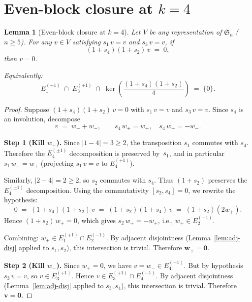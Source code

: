 \documentclass[11pt]{article}
\newtheorem{lemma}[theorem]{Lemma}
\theoremstyle{definition}
\theoremstyle{remark}
\newcommand{\Sym}{\mathfrak{S}}
\begin{document}
\section{Even-block closure at $k = 4$}

\begin{lemma}[Even-block closure at $k = 4$]\label{lem:k4}
Let $V$ be any representation of\/ $\Sym_n$ ($n \ge 5$).  For any
$v \in V$ satisfying $s_1\, v = v$ and $s_3\, v = v$, if
\[
  (1 + s_4)(1 + s_2)\, v \;=\; 0,
\]
then $v = 0$.

\noindent
Equivalently:
\[
  E_1^{(+1)} \;\cap\; E_3^{(+1)} \;\cap\;
  \ker\!\left(\frac{(1 + s_4)(1 + s_2)}{4}\right) \;=\; \{0\}.
\]
\end{lemma}

\begin{proof}
Suppose $(1 + s_4)(1 + s_2)\, v = 0$ with $s_1\, v = v$ and
$s_3\, v = v$.  Since $s_4$ is an involution, decompose
\[
  v \;=\; w_+ + w_-, \qquad s_4\, w_+ = w_+,\quad s_4\, w_- = -w_-.
\]

\medskip
\noindent\textbf{Step 1 (Kill $w_+$).}\;
Since $|1 - 4| = 3 \ge 2$, the transposition $s_1$ commutes with
$s_4$.  Therefore the $E_4^{(\pm 1)}$ decomposition is preserved
by~$s_1$, and in particular $s_1\, w_+ = w_+$ (projecting
$s_1\, v = v$ to $E_4^{(+1)}$).

Similarly, $|2 - 4| = 2 \ge 2$, so $s_2$ commutes with $s_4$.
Thus $(1 + s_2)$ preserves the $E_4^{(\pm 1)}$ decomposition.
Using the commutativity $[s_2, s_4] = 0$, we rewrite the hypothesis:
\[
  0 \;=\; (1 + s_4)(1 + s_2)\, v
    \;=\; (1 + s_2)(1 + s_4)\, v
    \;=\; (1 + s_2)(2 w_+).
\]
Hence $(1 + s_2)\, w_+ = 0$, which gives $s_2\, w_+ = -w_+$,
i.e., $w_+ \in E_2^{(-1)}$.

Combining: $w_+ \in E_1^{(+1)} \cap E_2^{(-1)}$.  By adjacent
disjointness (Lemma~\ref{lem:adj-disj} applied to $s_1, s_2$),
this intersection is trivial.  Therefore $\boldsymbol{w_+ = 0}$.

\medskip
\noindent\textbf{Step 2 (Kill $w_-$).}\;
Since $w_+ = 0$, we have $v = w_- \in E_4^{(-1)}$.  But by
hypothesis $s_3\, v = v$, so $v \in E_3^{(+1)}$.  Hence
$v \in E_3^{(+1)} \cap E_4^{(-1)}$.  By adjacent disjointness
(Lemma~\ref{lem:adj-disj} applied to $s_3, s_4$), this intersection
is trivial.  Therefore $\boldsymbol{v = 0}$.
\end{proof}
\end{document}
